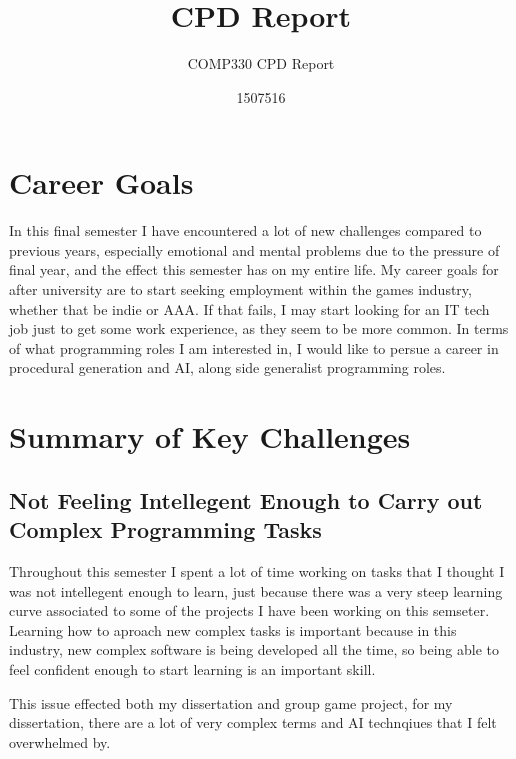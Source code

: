\documentclass{scrartcl}
\title{CPD Report}
\subtitle{COMP330 CPD Report}
\author{1507516}
\begin{document}
\maketitle


\section{Career Goals}
In this final semester I have encountered a lot of new challenges compared to previous years, especially emotional and mental problems due to the pressure of final year, and the effect this semester has on my entire life.
My career goals for after university are to start seeking employment within the games industry, whether that be indie or AAA. If that fails, I may start looking for an IT tech job just to get some work experience, as they seem to be more common.
In terms of what programming roles I am interested in, I would like to persue a career in procedural generation and AI, along side generalist programming roles.

\section{Summary of Key Challenges}


\subsection{Not Feeling Intellegent Enough to Carry out Complex Programming Tasks}
Throughout this semester I spent a lot of time working on tasks that I thought I was not intellegent enough to learn, just because there was a very steep learning curve associated to some of the projects I have been working on this semseter.
Learning how to aproach new complex tasks is important because in this industry, new complex software is being developed all the time, so being able to feel confident enough to start learning is an important skill.
\par

This issue effected both my dissertation and group game project, for my dissertation, there are a lot of very complex terms and AI technqiues that I felt overwhelmed by.

\par
\end{document}
